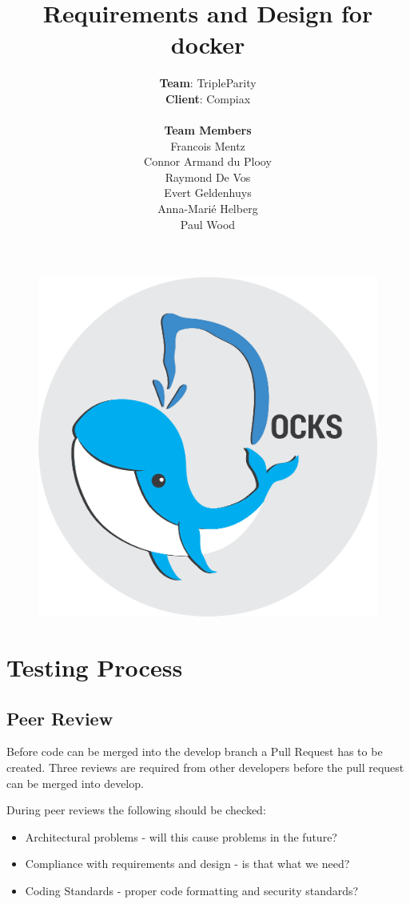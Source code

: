 \documentclass[]{article}
\title{\vspace{-1.0cm}Requirements and Design for docker}
\author{\textbf{Team}: TripleParity\\
\textbf{Client}: Compiax\\
\\
\textbf{Team Members}\\
Francois Mentz\\
Connor Armand du Plooy\\
Raymond De Vos\\
Evert Geldenhuys\\
Anna-Marié Helberg\\
Paul Wood}
\date{}
\begin{document}
\begin{figure}[]
	\includegraphics[scale=0.7]{docks_round_512.png}
	\centering
\end{figure}

\maketitle

\tableofcontents
\pagebreak

\section{Testing Process}

\subsection{Peer Review}
Before code can be merged into the develop branch a Pull Request has to be created.
Three reviews are required from other developers before the pull request
can be merged into develop.

During peer reviews the following should be checked:
\begin{itemize}
	\item Architectural problems - will this cause problems in the future?
	\item Compliance with requirements and design - is that what we need?
	\item Coding Standards - proper code formatting and security standards?
\end{itemize}
\end{document}
